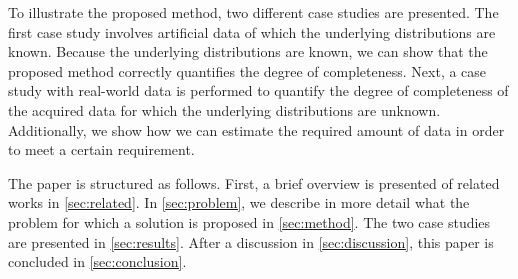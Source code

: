 To illustrate the proposed method, two different case studies are presented. The first case study involves artificial data of which the underlying distributions are known. Because the underlying distributions are known, we can show that the proposed method correctly quantifies the degree of completeness. Next, a case study with real-world data is performed to quantify the degree of completeness of the acquired data for which the underlying distributions are unknown. Additionally, we show how we can estimate the required amount of data in order to meet a certain requirement.

The paper is structured as follows. First, a brief overview is presented of related works in \cref{sec:related}. In \cref{sec:problem}, we describe in more detail what the problem for which a solution is proposed in \cref{sec:method}. The two case studies are presented in \cref{sec:results}. After a discussion in \cref{sec:discussion}, this paper is concluded in \cref{sec:conclusion}.

